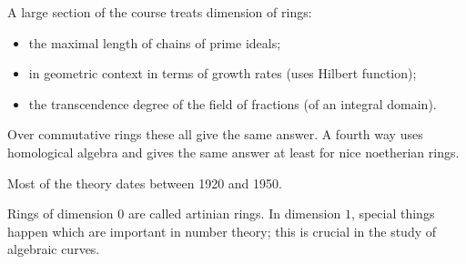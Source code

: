A large section of the course treats dimension of rings:
\begin{itemize}
	\item the maximal length of chains of prime ideals;
	\item in geometric context in terms of growth rates (uses Hilbert function);
	\item the transcendence degree of the field of fractions (of an integral domain).
\end{itemize}
Over commutative rings these all give the same answer. A fourth way uses homological
algebra and gives the same answer at least for nice noetherian rings.

Most of the theory dates between 1920 and 1950.

Rings of dimension $0$ are called artinian rings. In dimension $1$, special things
happen which are important in number theory; this is crucial in the study of algebraic
curves.
